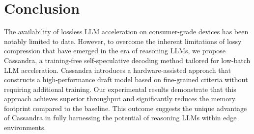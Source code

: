 \section{Conclusion}
\label{section_9_1}
The availability of lossless LLM acceleration on consumer-grade devices has been notably limited to date. However, to overcome the inherent limitations of lossy compression that have emerged in the era of reasoning LLMs, we propose Cassandra, a training-free self-speculative decoding method tailored for low-batch LLM acceleration. Cassandra introduces a hardware-assisted approach that constructs a high-performance draft model based on fine-grained criteria without requiring additional training. Our experimental results demonstrate that this approach achieves superior throughput and significantly reduces the memory footprint compared to the baseline. This outcome suggests the unique advantage of Cassandra in fully harnessing the potential of reasoning LLMs within edge environments.